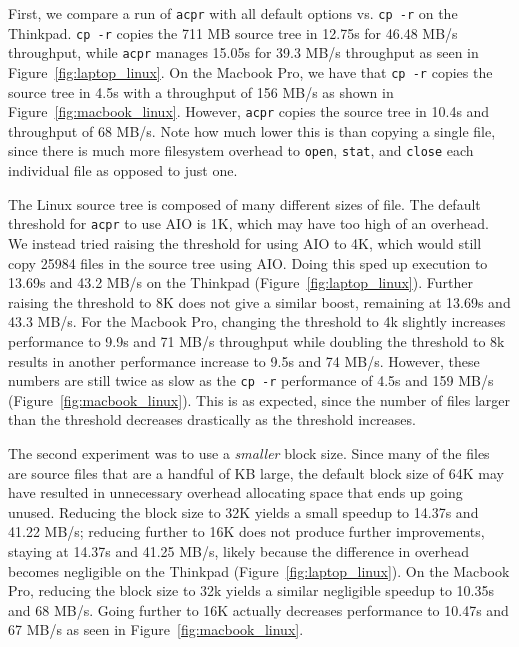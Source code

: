 \documentclass[11pt]{article}
\begin{document}
First, we compare a run of \texttt{acpr} with all default options vs. \texttt{cp
-r} on the Thinkpad. \texttt{cp -r} copies the 711 MB source tree in 12.75s for
46.48 MB/s throughput, while \texttt{acpr} manages 15.05s for 39.3 MB/s
throughput as seen in Figure~\ref{fig:laptop_linux}. On the Macbook Pro, we have
that \texttt{cp -r} copies the source tree in 4.5s with a throughput of 156 MB/s
as shown in Figure~\ref{fig:macbook_linux}. However, \texttt{acpr} copies the
source tree in 10.4s and throughput of 68 MB/s. Note how much lower this is than
copying a single file, since there is much more filesystem overhead to
\texttt{open}, \texttt{stat}, and \texttt{close} each individual file as opposed
to just one. 

The Linux source tree is composed of many different sizes of file. The default
threshold for \texttt{acpr} to use AIO is 1K, which may have too high of an
overhead. We instead tried raising the threshold for using AIO to 4K, which
would still copy 25984 files in the source tree using AIO. Doing this sped up
execution to 13.69s and 43.2 MB/s on the Thinkpad
(Figure~\ref{fig:laptop_linux}). Further raising the threshold to 8K does not
give a similar boost, remaining at 13.69s and 43.3 MB/s. For the Macbook Pro,
changing the threshold to 4k slightly increases performance to 9.9s and 71 MB/s
throughput while doubling the threshold to 8k results in another performance
increase to 9.5s and 74 MB/s. However, these numbers are still twice as slow as
the \texttt{cp -r} performance of 4.5s and 159 MB/s
(Figure~\ref{fig:macbook_linux}). This is as expected, since the number of files
larger than the threshold decreases drastically as the threshold increases.

The second experiment was to use a \textit{smaller} block size. Since many of
the files are source files that are a handful of KB large, the default block
size of 64K may have resulted in unnecessary overhead allocating space that ends
up going unused. Reducing the block size to 32K yields a small speedup to 14.37s
and 41.22 MB/s; reducing further to 16K does not produce further improvements,
staying at 14.37s and 41.25 MB/s, likely because the difference in overhead
becomes negligible on the Thinkpad (Figure~\ref{fig:laptop_linux}). On the
Macbook Pro, reducing the block size to 32k yields a similar negligible speedup to
10.35s and 68 MB/s. Going further to 16K actually decreases performance to
10.47s and 67 MB/s as seen in Figure~\ref{fig:macbook_linux}.
\end{document}
